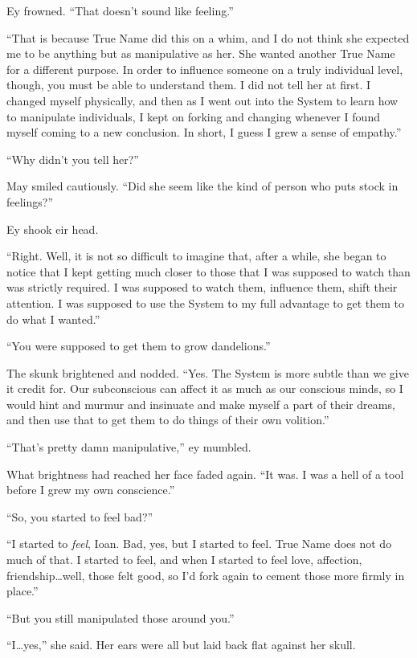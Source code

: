 Ey frowned. ``That doesn't sound like feeling.''

``That is because True Name did this on a whim, and I do not think she expected me to be anything but as manipulative as her. She wanted another True Name for a different purpose. In order to influence someone on a truly individual level, though, you must be able to understand them. I did not tell her at first. I changed myself physically, and then as I went out into the System to learn how to manipulate individuals, I kept on forking and changing whenever I found myself coming to a new conclusion. In short, I guess I grew a sense of empathy.''

``Why didn't you tell her?''

May smiled cautiously. ``Did she seem like the kind of person who puts stock in feelings?''

Ey shook eir head.

``Right. Well, it is not so difficult to imagine that, after a while, she began to notice that I kept getting much closer to those that I was supposed to watch than was strictly required. I was supposed to watch them, influence them, shift their attention. I was supposed to use the System to my full advantage to get them to do what I wanted.''

``You were supposed to get them to grow dandelions.''

The skunk brightened and nodded. ``Yes. The System is more subtle than we give it credit for. Our subconscious can affect it as much as our conscious minds, so I would hint and murmur and insinuate and make myself a part of their dreams, and then use that to get them to do things of their own volition.''

``That's pretty damn manipulative,'' ey mumbled.

What brightness had reached her face faded again. ``It was. I was a hell of a tool before I grew my own conscience.''

``So, you started to feel bad?''

``I started to \emph{feel}, Ioan. Bad, yes, but I started to feel. True Name does not do much of that. I started to feel, and when I started to feel love, affection, friendship\ldots well, those felt good, so I'd fork again to cement those more firmly in place.''

``But you still manipulated those around you.''

``I\ldots yes,'' she said. Her ears were all but laid back flat against her skull.

